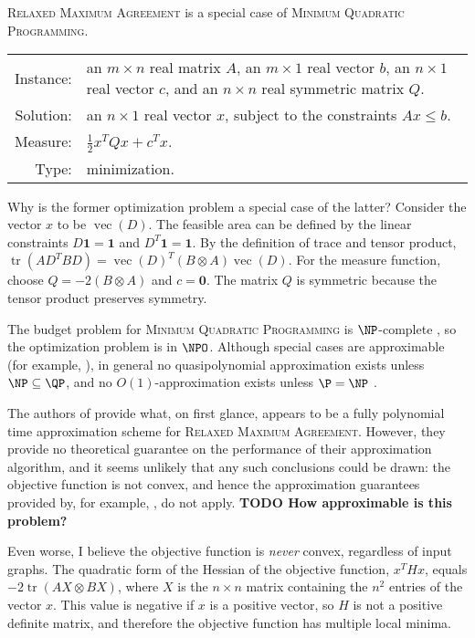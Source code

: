 \documentclass{article}
\newcommand{\todo}[1]{\textbf{TODO #1}}
\newcommand{\1}{\mathbf{1}}
\newcommand{\RMA}{\textsc{Relaxed Maximum Agreement}}
\newcommand{\MQP}{\textsc{Minimum Quadratic Programming}}
\DeclareMathOperator{\tr}{tr}
\DeclareMathOperator{\vect}{vec}
\begin{document}
\RMA{} is a special case of \MQP{}.

\begin{definition}[\MQP{}]
  \mbox{}

  \begin{tabular}{r p{9.3cm}}
    Instance: & an $m \times n$ real matrix $A$, an $m \times 1$ real vector $b$, an $n \times 1$ real vector $c$, and an $n \times n$ real symmetric matrix $Q$. \\
    Solution: & an $n \times 1$ real vector $x$, subject to the constraints $Ax \leq b$. \\
    Measure: & $\frac{1}{2} x^T Q x + c^T x$. \\
    Type: & minimization.
  \end{tabular}
\end{definition}

Why is the former optimization problem a special case of the latter?
Consider the vector $x$ to be $\vect(D)$.
The feasible area can be defined by the linear constraints $D \1 = \1$ and $D^T \1 = \1$.
By the definition of trace and tensor product, $\tr(AD^TBD) = \vect(D)^T (B \otimes A) \vect(D)$.
For the measure function, choose $Q = -2(B \otimes A)$ and $c = \mathbf{0}$.
The matrix $Q$ is symmetric because the tensor product preserves symmetry.

The budget problem for \MQP{} is $\NP$-complete \autocite{vavasis90}, so the optimization problem is in $\NPO$.
Although special cases are approximable (for example, \autocite{vavasis92, fly98}), in general no quasipolynomial approximation exists unless $\NP \subseteq \QP$, and no $O(1)$-approximation exists unless $\P = \NP$ \autocite{br95}.

The authors of \autocite{v14} provide what, on first glance, appears to be a fully polynomial time approximation scheme for \RMA{}.
However, they provide no theoretical guarantee on the performance of their approximation algorithm, and it seems unlikely that any such conclusions could be drawn: the objective function is not convex, and hence the approximation guarantees provided by, for example, \autocite[Theorem~2.3]{jaggi11}, do not apply.
\todo{How approximable is this problem?}

Even worse, I believe the objective function is \emph{never} convex, regardless of input graphs.
The quadratic form of the Hessian of the objective function, $x^T H x$, equals $-2 \tr(AX \otimes BX)$, where $X$ is the $n \times n$ matrix containing the $n^2$ entries of the vector $x$.
This value is negative if $x$ is a positive vector, so $H$ is not a positive definite matrix, and therefore the objective function has multiple local minima.
\end{document}
